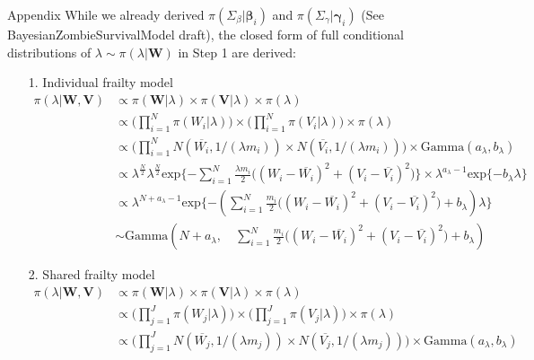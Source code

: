 \documentclass[a4paper, 12pt]{article}
\makeatletter
\renewcommand{\section}{\@startsection
	{section}    {1}    {0mm}    {-0.7\baselineskip}    {0.08\baselineskip}    {\normalfont\large\sc\center\bf}}
\makeatother
\begin{document}
\section{Appendix}
\noindent While we already derived $\pi(\Sigma_{\beta}|\mathbf{\beta}_i)$ and $\pi(\Sigma_{\gamma}|\mathbf{\gamma}_i)$ (See BayesianZombieSurvivalModel draft), the closed form of full conditional distributions of $\lambda \sim \pi(\lambda|\mathbf{W})$ in Step 1 are derived:
\begin{itemize}
	\item [1.] Individual frailty model
	\begin{equation*}
	\begin{aligned}
\pi(\lambda|\mathbf{W}, \mathbf{V})	&\propto\pi(\mathbf{W}|\lambda)\times \pi(\mathbf{V}|\lambda)\times \pi(\lambda) \\
	&\propto \Big(\prod_{i=1}^N \pi(W_i|\lambda)\Big) \times\Big(\prod_{i=1}^N \pi(V_i|\lambda)\Big) \times \pi(\lambda)\\
	& \propto \Big(\prod_{i=1}^N N(\overline{W_i}, 1/(\lambda m_i)) \times N(\overline{V_i}, 1/(\lambda m_i)) \Big) \times \mbox{Gamma}(a_{\lambda}, b_{\lambda})\\
	& \propto \lambda^{\frac{N}{2}} \lambda^{\frac{N}{2}} \mbox{exp}\{-\sum_{i=1}^N \frac{\lambda m_i}{2}\Big((W_i - \overline{W_i})^2 + (V_i - \overline{V_i})^2\Big)\} \times \lambda^{a_{\lambda}-1}\mbox{exp}\{-b_{\lambda}\lambda\}\\
	& \propto \lambda^{{N} + a_{\lambda}-1}\mbox{exp}\{-(\sum_{i=1}^N \frac{ m_i}{2}\Big((W_i - \overline{W_i})^2 + (V_i - \overline{V_i})^2\Big)+b_{\lambda})\lambda\} \\
	&\sim \mbox{Gamma}(N + a_{\lambda},\quad \sum_{i=1}^N \frac{ m_i}{2}\Big((W_i - \overline{W_i})^2+ (V_i - \overline{V_i})^2 \Big)+b_{\lambda})	
	\end{aligned}
	\end{equation*} 
	\item [2.] Shared frailty model
		\begin{equation*}
		\begin{aligned}
		\pi(\lambda|\mathbf{W}, \mathbf{V})	&\propto\pi(\mathbf{W}|\lambda)\times \pi(\mathbf{V}|\lambda)\times \pi(\lambda) \\
		&\propto \Big(\prod_{j=1}^J \pi(W_j|\lambda)\Big) \times\Big(\prod_{j=1}^J \pi(V_j|\lambda)\Big) \times \pi(\lambda)\\
		& \propto \Big(\prod_{j=1}^J N(\overline{W_j}, 1/(\lambda m_j)) \times N(\overline{V_j}, 1/(\lambda m_j)) \Big) \times \mbox{Gamma}(a_{\lambda}, b_{\lambda})\\

\end{aligned}
\end{equation*}
\end{itemize}
\end{document}
